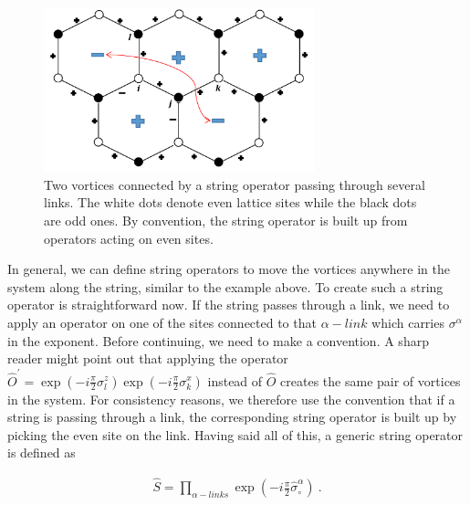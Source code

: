 \documentclass{article}
\begin{document}
\begin{figure}[!htb]
    \centering
    \includegraphics[width=0.7\textwidth]{./images/Anyons_Strings}
    \caption{Two vortices connected by a string operator passing through several links. The white dots denote even lattice sites while the black dots are odd ones. By convention, the string operator is built up from operators acting on even sites.}
    \label{fig:string}
\end{figure}{}

In general, we can define string operators to move the vortices anywhere in the system along the string, similar to the example above. To create such a string operator is straightforward now. If the string passes through a link, we need to apply an operator on one of the sites connected to that $\alpha-link$ which carries $\sigma^\alpha$ in the exponent. Before continuing, we need to make a convention. A sharp reader might point out that applying the operator $\hat{O}^{'} = \exp{(-i\frac{\pi}{2}\sigma^z_l)} \exp{(-i\frac{\pi}{2}\sigma^x_k)}$ instead of $\hat{O}$ creates the same pair of vortices in the system. For consistency reasons, we therefore use the convention that if a string is passing through a link, the corresponding string operator is built up by picking the even site on the link. Having said all of this,  a generic string operator is defined as

\begin{equation}\label{eq:29}
	\begin{aligned}
		\hat{S} = \prod_{\alpha-links} \exp{(-i\frac{\pi}{2}\hat{\sigma}^\alpha_\circ)}~.
		\end{aligned}
\end{equation}
\end{document}
